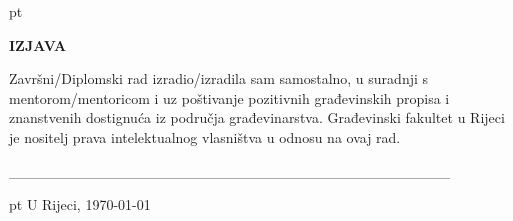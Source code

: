 \newpage

\thispagestyle{empty}
\mbox{}
\thispagestyle{empty}

\newpage

\thispagestyle{empty}
\mbox{}
\thispagestyle{empty}


 pt

\begin{center}
{\fontsize{14pt}{16.8pt}\selectfont \textbf{IZJAVA}\par}\par
\end{center}\par

\vspace{\baselineskip}

\vspace{\baselineskip}
\begin{justify}
	\begin{onehalfspace}
Završni/Diplomski rad izradio/izradila sam samostalno, u suradnji s mentorom/mentoricom i uz poštivanje pozitivnih građevinskih propisa i znanstvenih dostignuća iz područja građevinarstva. Građevinski fakultet u Rijeci je nositelj prava intelektualnog vlasništva u odnosu na ovaj rad. 
	\end{onehalfspace}

\end{justify}\par


\vspace{\baselineskip}

\vspace{\baselineskip}

\vspace{\baselineskip}
\_\_\_\_\_\_\_\_\_\_\_\_\_\_\_\_\_\_\_\_\_\_\_\_\_\_\_\_\_\_\_\_\_\_\_\_\_\_\_\_\_\_ \par

{\autor}\par



 pt
U Rijeci, {\today}\par

\newpage

\thispagestyle{empty}
\mbox{}
\thispagestyle{empty}